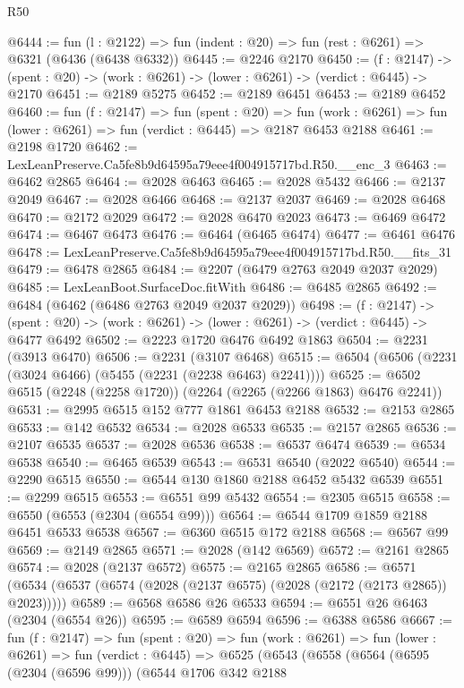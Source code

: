 \begin{lexlean}{R50}
\begin{coremodule}
@6444 := fun (l : @2122) => fun (indent : @20) => fun (rest : @6261) => @6321 (@6436 (@6438 @6332))
@6445 := @2246 @2170
@6450 := (f : @2147) ->
  (spent : @20) -> (work : @6261) -> (lower : @6261) -> (verdict : @6445) -> @2170
@6451 := @2189 @5275
@6452 := @2189 @6451
@6453 := @2189 @6452
@6460 := fun (f : @2147) =>
  fun (spent : @20) =>
  fun (work : @6261) => fun (lower : @6261) => fun (verdict : @6445) => @2187 @6453 @2188
@6461 := @2198 @1720
@6462 := LexLeanPreserve.Ca5fe8b9d64595a79eee4f004915717bd.R50.__enc_3
@6463 := @6462 @2865
@6464 := @2028 @6463
@6465 := @2028 @5432
@6466 := @2137 @2049
@6467 := @2028 @6466
@6468 := @2137 @2037
@6469 := @2028 @6468
@6470 := @2172 @2029
@6472 := @2028 @6470 @2023
@6473 := @6469 @6472
@6474 := @6467 @6473
@6476 := @6464 (@6465 @6474)
@6477 := @6461 @6476
@6478 := LexLeanPreserve.Ca5fe8b9d64595a79eee4f004915717bd.R50.__fits_31
@6479 := @6478 @2865
@6484 := @2207 (@6479 @2763 @2049 @2037 @2029)
@6485 := LexLeanBoot.SurfaceDoc.fitWith
@6486 := @6485 @2865
@6492 := @6484 (@6462 (@6486 @2763 @2049 @2037 @2029))
@6498 := (f : @2147) ->
  (spent : @20) -> (work : @6261) -> (lower : @6261) -> (verdict : @6445) -> @6477 @6492
@6502 := @2223 @1720 @6476 @6492 @1863
@6504 := @2231 (@3913 @6470)
@6506 := @2231 (@3107 @6468)
@6515 := @6504 (@6506 (@2231 (@3024 @6466) (@5455 (@2231 (@2238 @6463) @2241))))
@6525 := @6502 @6515 (@2248 (@2258 @1720)) (@2264 (@2265 (@2266 @1863) @6476 @2241))
@6531 := @2995 @6515 @152 @777 @1861 @6453 @2188
@6532 := @2153 @2865
@6533 := @142 @6532
@6534 := @2028 @6533
@6535 := @2157 @2865
@6536 := @2107 @6535
@6537 := @2028 @6536
@6538 := @6537 @6474
@6539 := @6534 @6538
@6540 := @6465 @6539
@6543 := @6531 @6540 (@2022 @6540)
@6544 := @2290 @6515
@6550 := @6544 @130 @1860 @2188 @6452 @5432 @6539
@6551 := @2299 @6515
@6553 := @6551 @99 @5432
@6554 := @2305 @6515
@6558 := @6550 (@6553 (@2304 (@6554 @99)))
@6564 := @6544 @1709 @1859 @2188 @6451 @6533 @6538
@6567 := @6360 @6515 @172 @2188
@6568 := @6567 @99
@6569 := @2149 @2865
@6571 := @2028 (@142 @6569)
@6572 := @2161 @2865
@6574 := @2028 (@2137 @6572)
@6575 := @2165 @2865
@6586 := @6571 (@6534 (@6537 (@6574 (@2028 (@2137 @6575) (@2028 (@2172 (@2173 @2865)) @2023)))))
@6589 := @6568 @6586 @26 @6533
@6594 := @6551 @26 @6463 (@2304 (@6554 @26))
@6595 := @6589 @6594
@6596 := @6388 @6586
@6667 := fun (f : @2147) =>
  fun (spent : @20) =>
  fun (work : @6261) =>
  fun (lower : @6261) =>
  fun (verdict : @6445) =>
  @6525
    (@6543
      (@6558
        (@6564
          (@6595 (@2304 (@6596 @99)))
          (@6544
            @1706
            @342
            @2188

\end{coremodule}
\end{lexlean}
